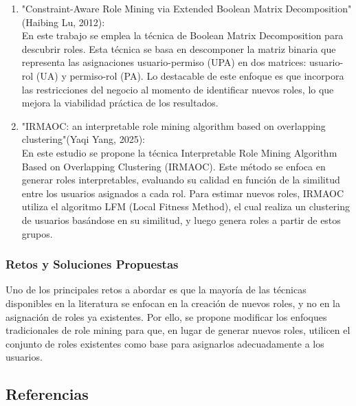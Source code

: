 \documentclass[11pt,letterpaper]{article}
\begin{document}
\begin{enumerate}
    \item{"Constraint-Aware Role Mining via Extended Boolean Matrix Decomposition" (Haibing Lu, 2012):\\}
    En este trabajo se emplea la técnica de Boolean Matrix Decomposition para descubrir roles. Esta técnica se basa en descomponer la matriz binaria que representa las asignaciones usuario-permiso (UPA) en dos matrices: usuario-rol (UA) y permiso-rol (PA). Lo destacable de este enfoque es que incorpora las restricciones del negocio al momento de identificar nuevos roles, lo que mejora la viabilidad práctica de los resultados.

    \item{"IRMAOC: an interpretable role mining algorithm based on overlapping clustering"(Yaqi Yang, 2025):\\}
    En este estudio se propone la técnica Interpretable Role Mining Algorithm Based on Overlapping Clustering (IRMAOC). Este método se enfoca en generar roles interpretables, evaluando su calidad en función de la similitud entre los usuarios asignados a cada rol. Para estimar nuevos roles, IRMAOC utiliza el algoritmo LFM (Local Fitness Method), el cual realiza un clustering de usuarios basándose en su similitud, y luego genera roles a partir de estos grupos.
\end{enumerate}



\subsubsection{Retos y Soluciones Propuestas}
Uno de los principales retos a abordar es que la mayoría de las técnicas disponibles en la literatura se enfocan en la creación de nuevos roles, y no en la asignación de roles ya existentes. Por ello, se propone modificar los enfoques tradicionales de role mining para que, en lugar de generar nuevos roles, utilicen el conjunto de roles existentes como base para asignarlos adecuadamente a los usuarios.

\subsection{Referencias}
\end{document}
